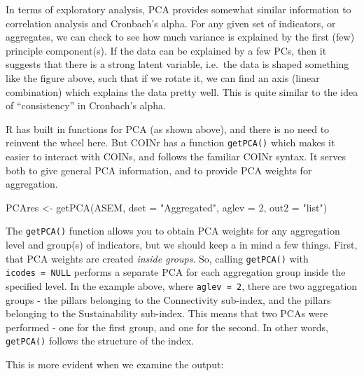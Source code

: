 \documentclass[
]{book}
\newenvironment{Shaded}{\begin{snugshade}}{\end{snugshade}}
\newcommand{\AttributeTok}[1]{\textcolor[rgb]{0.77,0.63,0.00}{#1}}
\newcommand{\DecValTok}[1]{\textcolor[rgb]{0.00,0.00,0.81}{#1}}
\newcommand{\DocumentationTok}[1]{\textcolor[rgb]{0.56,0.35,0.01}{\textbf{\textit{#1}}}}
\newcommand{\FunctionTok}[1]{\textcolor[rgb]{0.00,0.00,0.00}{#1}}
\newcommand{\NormalTok}[1]{#1}
\newcommand{\OtherTok}[1]{\textcolor[rgb]{0.56,0.35,0.01}{#1}}
\newcommand{\StringTok}[1]{\textcolor[rgb]{0.31,0.60,0.02}{#1}}
\begin{document}
In terms of exploratory analysis, PCA provides somewhat similar information to correlation analysis and Cronbach's alpha. For any given set of indicators, or aggregates, we can check to see how much variance is explained by the first (few) principle component(s). If the data can be explained by a few PCs, then it suggests that there is a strong latent variable, i.e.~the data is shaped something like the figure above, such that if we rotate it, we can find an axis (linear combination) which explains the data pretty well. This is quite similar to the idea of ``consistency'' in Cronbach's alpha.

R has built in functions for PCA (as shown above), and there is no need to reinvent the wheel here. But COINr has a function \texttt{getPCA()} which makes it easier to interact with COINs, and follows the familiar COINr syntax. It serves both to give general PCA information, and to provide PCA weights for aggregation.

\begin{Shaded}
\begin{Highlighting}[]
\NormalTok{PCAres }\OtherTok{\textless{}{-}} \FunctionTok{getPCA}\NormalTok{(ASEM, }\AttributeTok{dset =} \StringTok{"Aggregated"}\NormalTok{, }\AttributeTok{aglev =} \DecValTok{2}\NormalTok{, }\AttributeTok{out2 =} \StringTok{"list"}\NormalTok{)}
\end{Highlighting}
\end{Shaded}

The \texttt{getPCA()} function allows you to obtain PCA weights for any aggregation level and group(s) of indicators, but we should keep a in mind a few things. First, that PCA weights are created \emph{inside groups}. So, calling \texttt{getPCA()} with \texttt{icodes\ =\ NULL} performs a separate PCA for each aggregation group inside the specified level. In the example above, where \texttt{aglev\ =\ 2}, there are two aggregation groups - the pillars belonging to the Connectivity sub-index, and the pillars belonging to the Sustainability sub-index. This means that two PCAs were performed - one for the first group, and one for the second. In other words, \texttt{getPCA()} follows the structure of the index.

This is more evident when we examine the output:

\begin{Shaded}
\end{Shaded}
\end{document}
